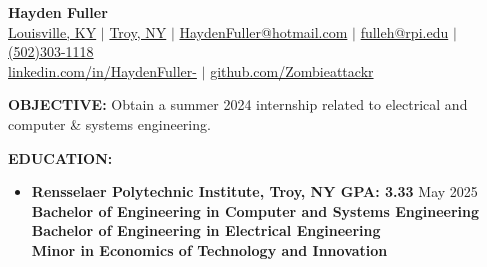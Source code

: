 \documentclass[11pt]{article}
\begin{document}
\begin{center}
\Large{\textbf{Hayden Fuller}} \\
\normalsize{\href{https://www.google.com/maps/place/Louisville,+KY/@38.1889916,-85.8168535,11z/data=!3m1!4b1!4m6!3m5!1s0x88690b1ab35bd511:0xd4d3b4282071fd32!8m2!3d38.2526647!4d-85.7584557!16zL20vMGZfXzE!5m1!1e4}{Louisville, KY} $|$ \href{https://www.google.com/maps/place/Rensselaer+Polytechnic+Institute/@42.7297667,-73.6814633,17z/data=!3m1!4b1!4m6!3m5!1s0x89de0f9eebfa097d:0xa5592b13db1f5302!8m2!3d42.7297628!4d-73.6788884!16zL20vMDFiazF5?entry=ttu}{Troy, NY} $|$ \href{mailto:HaydenFuller@hotmail.com}{HaydenFuller@hotmail.com} $|$ \href{mailto:fulleh@rpi.edu}{fulleh@rpi.edu} $|$ \href{tel:5023031118}{(502)303-1118} \\
\href{https://www.linkedin.com/in/haydenfuller-/}{linkedin.com/in/HaydenFuller-} $|$ \href{https://github.com/Zombieattackr}{github.com/Zombieattackr}}
\end{center}

\textbf{OBJECTIVE:} Obtain a summer 2024 internship related to electrical and computer \& systems engineering.

\vspace{0.2cm}

\textbf{EDUCATION:} 
\vspace{-0.35cm}
\begin{itemize}
    \item\textbf{Rensselaer Polytechnic Institute, Troy, NY \quad GPA: 3.33} \hfill May 2025 \\
    \textbf{Bachelor of Engineering in Computer and Systems Engineering \\
    Bachelor of Engineering in Electrical Engineering \\
    Minor in Economics of Technology and Innovation}
\end{itemize}
\end{document}
